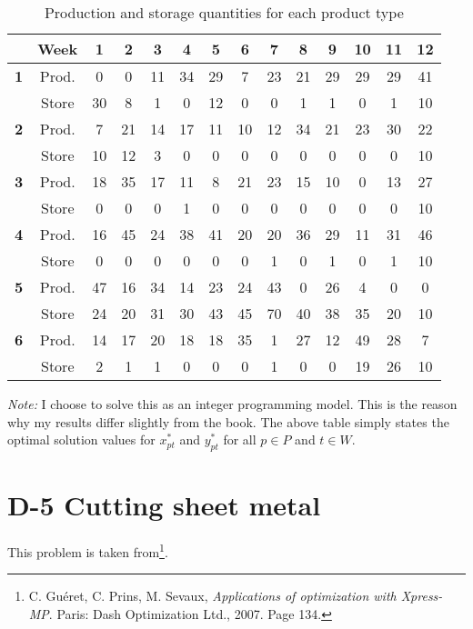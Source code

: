 \documentclass[8pt,oneside]{extarticle}
\begin{document}
\begin{table}[h]
    \center
    \caption{Production and storage quantities for each product type}
\begin{tabular}{cccccccccccccc}
    \hline
    & \textbf{Week} & \textbf{1} &\textbf{2} &\textbf{3} &\textbf{4} &\textbf{5} &\textbf{6} &\textbf{7} &\textbf{8} &\textbf{9} &\textbf{10} &\textbf{11} &\textbf{12} \\
    \hline
    \textbf{1} & Prod. & 0 & 0 & 11 & 34 & 29 & 7 & 23 & 21 & 29 & 29 & 29 & 41\\
& Store & 30 & 8 & 1 & 0 & 12 & 0 & 0 & 1 & 1 & 0 & 1 & 10\\
\textbf{2} & Prod. & 7 & 21 & 14 & 17 & 11 & 10 & 12 & 34 & 21 & 23 & 30 & 22\\
& Store & 10 & 12 & 3 & 0 & 0 & 0 & 0 & 0 & 0 & 0 & 0 & 10\\
\textbf{3} & Prod. & 18 & 35 & 17 & 11 & 8 & 21 & 23 & 15 & 10 & 0 & 13 & 27\\
& Store & 0 & 0 & 0 & 1 & 0 & 0 & 0 & 0 & 0 & 0 & 0 & 10\\
\textbf{4} & Prod. & 16 & 45 & 24 & 38 & 41 & 20 & 20 & 36 & 29 & 11 & 31 & 46\\
& Store & 0 & 0 & 0 & 0 & 0 & 0 & 1 & 0 & 1 & 0 & 1 & 10\\
\textbf{5} & Prod. & 47 & 16 & 34 & 14 & 23 & 24 & 43 & 0 & 26 & 4 & 0 & 0\\
& Store & 24 & 20 & 31 & 30 & 43 & 45 & 70 & 40 & 38 & 35 & 20 & 10\\
\textbf{6} & Prod. & 14 & 17 & 20 & 18 & 18 & 35 & 1 & 27 & 12 & 49 & 28 & 7\\
& Store & 2 & 1 & 1 & 0 & 0 & 0 & 1 & 0 & 0 & 19 & 26 & 10\\
\hline
\end{tabular}
\end{table}

\emph{Note:} I choose to solve this as an integer programming model. This is
the reason why my results differ slightly from the book. The above table simply states the optimal
solution values for $x_{pt}^*$ and $y_{pt}^*$ for all $p\in P$ and $t\in W$.

\section{D-5 Cutting sheet metal}

This problem is taken from\footnote{C. Guéret, C. Prins, M. Sevaux, \textit{Applications of optimization with Xpress-MP}. %
Paris: Dash Optimization Ltd., 2007. Page 134.}.
\end{document}
